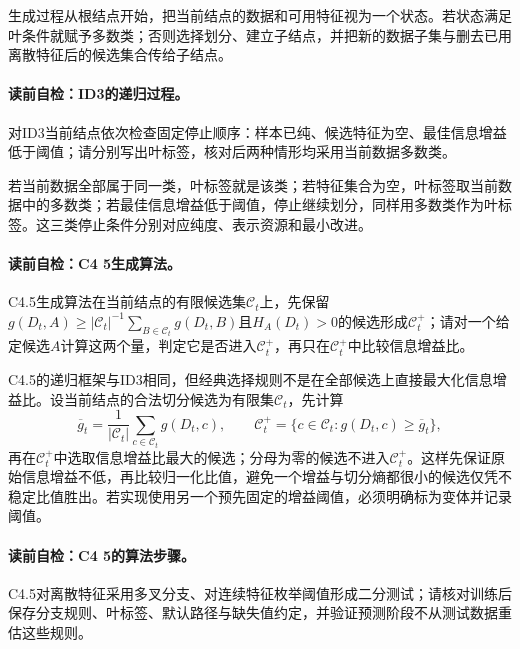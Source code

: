 生成过程从根结点开始，把当前结点的数据和可用特征视为一个状态。若状态满足叶条件就赋予多数类；否则选择划分、建立子结点，并把新的数据子集与删去已用离散特征后的候选集合传给子结点。

\paragraph{读前自检：ID3的递归过程。}对ID3当前结点依次检查固定停止顺序：样本已纯、候选特征为空、最佳信息增益低于阈值；请分别写出叶标签，核对后两种情形均采用当前数据多数类。\par

若当前数据全部属于同一类，叶标签就是该类；若特征集合为空，叶标签取当前数据中的多数类；若最佳信息增益低于阈值，停止继续划分，同样用多数类作为叶标签。这三类停止条件分别对应纯度、表示资源和最小改进。

\paragraph{读前自检：C4 5生成算法。}C4.5生成算法在当前结点的有限候选集$\mathcal C_t$上，先保留$g(D_t,A)\ge |\mathcal C_t|^{-1}\sum_{B\in\mathcal C_t}g(D_t,B)$且$H_A(D_t)>0$的候选形成$\mathcal C_t^+$；请对一个给定候选$A$计算这两个量，判定它是否进入$\mathcal C_t^+$，再只在$\mathcal C_t^+$中比较信息增益比。\par

C4.5的递归框架与ID3相同，但经典选择规则不是在全部候选上直接最大化信息增益比。设当前结点的合法切分候选为有限集$\mathcal C_t$，先计算
\[
\overline g_t=\frac{1}{|\mathcal C_t|}\sum_{c\in\mathcal C_t}g(D_t,c),
\qquad
\mathcal C_t^+=\{c\in\mathcal C_t:g(D_t,c)\geq\overline g_t\},
\]
再在$\mathcal C_t^+$中选取信息增益比最大的候选；分母为零的候选不进入$\mathcal C_t^+$。这样先保证原始信息增益不低，再比较归一化比值，避免一个增益与切分熵都很小的候选仅凭不稳定比值胜出。若实现使用另一个预先固定的增益阈值，必须明确标为变体并记录阈值。

\paragraph{读前自检：C4 5的算法步骤。}C4.5对离散特征采用多叉分支、对连续特征枚举阈值形成二分测试；请核对训练后保存分支规则、叶标签、默认路径与缺失值约定，并验证预测阶段不从测试数据重估这些规则。\par

